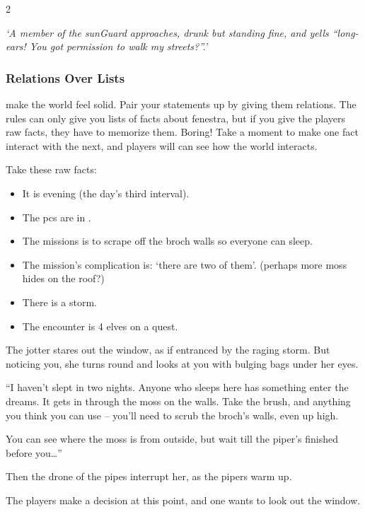 \begin{multicols}{2}
\begin{minipage}{\linewidth}
\textit{`A member of the \gls{sunGuard} approaches, drunk but standing fine, and yells ``long-ears! You got permission to walk my streets?''.'}
\end{minipage}


\subsubsection{Relations Over Lists}
make the world feel solid.
Pair your statements up by giving them relations.
The rules can only give you lists of facts about \gls{fenestra}, but if you give the players raw facts, they have to memorize them.
Boring!
Take a moment to make one fact interact with the next, and players will can see how the world interacts.

Take these raw facts:

\begin{itemize}
  \item
  It is evening (the day's third \gls{interval}).
  \item
  The \glspl{pc} are in .
  \item
  The missions is to scrape  off the \gls{broch} walls so everyone can sleep.
  \item
  The mission's complication is: `there are two of them'.
  (perhaps more moss hides on the roof?)
  \item
  There is a storm.
  \item
  The encounter is 4 elves on a quest.
\end{itemize}

\begin{boxtext}
  The \gls{jotter} stares out the window, as if entranced by the raging storm.
  But noticing you, she turns round and looks at you with bulging bags under her eyes.

  ``I haven't slept in two nights.
  Anyone who sleeps here has something enter the dreams.
  It gets in through the moss on the walls.
  Take the brush, and anything you think you can use -- you'll need to scrub the \gls{broch}'s walls, even up high.

  You can see where the moss is from outside, but wait till the piper's finished before you\ldots''

  Then the drone of the pipes interrupt her, as the pipers warm up.
\end{boxtext}

The players make a decision at this point, and one wants to look out the window.


\end{multicols}
